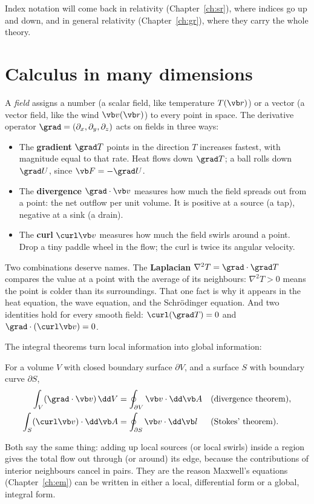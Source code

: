 Index notation will come back in relativity (Chapter~\ref{ch:sr}), where indices go up and down, and in general relativity (Chapter~\ref{ch:gr}), where they carry the whole theory.

\section{Calculus in many dimensions}

A \emph{field} assigns a number (a scalar field, like temperature $T(\vb r)$) or a vector (a vector field, like the wind $\vb v(\vb r)$) to every point in space. The derivative operator $\grad = (\partial_x, \partial_y, \partial_z)$ acts on fields in three ways:
\begin{itemize}[itemsep=3pt]
  \item The \textbf{gradient} $\grad T$ points in the direction $T$ increases fastest, with magnitude equal to that rate. Heat flows down $\grad T$; a ball rolls down $\grad U$, since $\vb F = -\grad U$.
  \item The \textbf{divergence} $\grad\cdot\vb v$ measures how much the field spreads out from a point: the net outflow per unit volume. It is positive at a source (a tap), negative at a sink (a drain).
  \item The \textbf{curl} $\curl\vb v$ measures how much the field swirls around a point. Drop a tiny paddle wheel in the flow; the curl is twice its angular velocity.
\end{itemize}
Two combinations deserve names. The \textbf{Laplacian} $\nabla^{2}T = \grad\cdot\grad T$ compares the value at a point with the average of its neighbours: $\nabla^2 T > 0$ means the point is colder than its surroundings. That one fact is why it appears in the heat equation, the wave equation, and the Schrödinger equation. And two identities hold for every smooth field: $\curl(\grad T) = 0$ and $\grad\cdot(\curl\vb v) = 0$.

The integral theorems turn local information into global information:
\begin{law}
For a volume $V$ with closed boundary surface $\partial V$, and a surface $S$ with boundary curve $\partial S$,
\begin{align*}
  \int_V (\grad\cdot\vb v)\,\dd V &= \oint_{\partial V} \vb v\cdot \dd\vb A
  &&\text{(divergence theorem)},\\
  \int_S (\curl\vb v)\cdot\dd\vb A &= \oint_{\partial S} \vb v\cdot\dd\vb l
  &&\text{(Stokes' theorem)}.
\end{align*}
\end{law}
Both say the same thing: adding up local sources (or local swirls) inside a region gives the total flow out through (or around) its edge, because the contributions of interior neighbours cancel in pairs. They are the reason Maxwell's equations (Chapter~\ref{ch:em}) can be written in either a local, differential form or a global, integral form.

